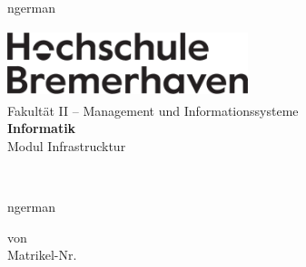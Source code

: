 \begin{titlepage}
	\pagestyle{empty}
	\centering

	\vspace*{0.5cm}
	\begin{otherlanguage*}{ngerman}
		\begin{sffamily}
			{
				\includegraphics[width=7cm, height=2cm]{images/hs-logo.png}\\[5mm]
				\Large
				Fakultät II -- Management und Informationssysteme\\[0.1em]
				\textbf{Informatik}\\[0.5em]
				Modul Infrastrucktur
			}
		\end{sffamily}
	\end{otherlanguage*}

	\vspace*{2cm}

	\begin{sffamily}
		\huge \bfseries
		\makeatletter
		\@title
		\makeatother
		\\
	\end{sffamily}

	\vspace*{1cm}

	\begin{otherlanguage*}{ngerman}

		\vspace*{3cm}

		von\\[0.75em]
		{
		\large
		\textbf{\autor}\quad Matrikel-Nr. \matrikelnr\\

		\vspace*{2cm}
		\makeatletter
		\@date
		\makeatother
		}

		{
		\vspace*{3cm}
		\centering
		\large
		\makeatletter
		{\profA}\\
		{\profB}
		\makeatother
		}

		\vfill
	\end{otherlanguage*}
\end{titlepage}